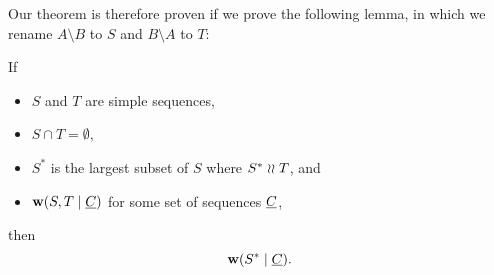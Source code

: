 Our theorem is therefore proven if we prove the following lemma,
in which we rename $A\setminus B$ to $S$ and $B\setminus A$ to $T$:
\newcommand{\condSimple}{(c1)}
\newcommand{\condDisj}{(c2)}
\newcommand{\condApr}{(c3)}
\newcommand{\condWork}{(c4)}
\begin{mylem}
If
   \begin{itemize}
   \item[\condSimple] $S$ and $T$ are simple sequences,
   \item[\condDisj] $S\cap T=\emptyset$,
   \item[\condApr] $S^*$ is the largest subset of $S$ where $S^*\mathrel{\wr\wr} T$, and
   \item[\condWork] $\mathbf{w}({S,T}\mathrel{|}{\underline{C}})$ for some set of sequences $\underline{C}$,
   \end{itemize}
then
\[ \mathbf{w}({S^*}\mathrel{|}{\underline{C}}). \]
\end{mylem}

